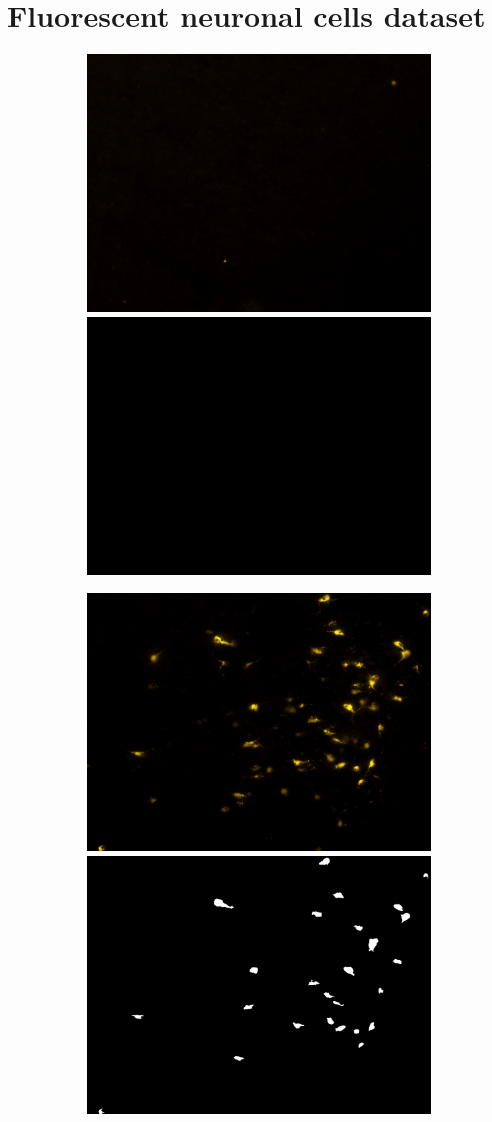 \chapter{Fluorescent neuronal cells dataset}
\label{chap:partI_dataset}

\begin{figure}%
\begin{subfigure}{1.1\textwidth}
\includegraphics[width=0.5\linewidth]{figures/120_dataset/i_empty.png}
\includegraphics[width=0.5\linewidth]{figures/120_dataset/m_empty.png}
\subcaption{}
\label{fig:dataset:empty}
\end{subfigure}

\centering
\begin{subfigure}{1.1\textwidth}
\includegraphics[width=0.5\linewidth]{figures/120_dataset/i_168.jpeg}
\includegraphics[width=0.5\linewidth]{figures/120_dataset/m_168.png}
\subcaption{}
\label{fig:dataset:dark}
\end{subfigure}


\end{figure}

